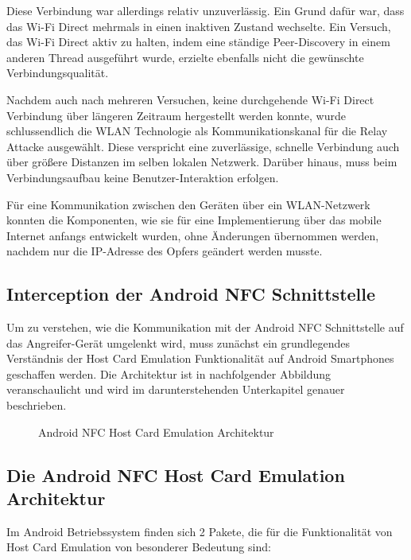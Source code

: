 Diese Verbindung war allerdings relativ unzuverlässig. Ein Grund dafür war, dass das Wi-Fi Direct mehrmals in einen inaktiven Zustand wechselte. Ein Versuch, das Wi-Fi Direct aktiv zu halten, indem eine ständige Peer-Discovery in einem anderen Thread ausgeführt wurde, erzielte ebenfalls nicht die gewünschte Verbindungsqualität. 

Nachdem auch nach mehreren Versuchen, keine durchgehende Wi-Fi Direct Verbindung über längeren Zeitraum hergestellt werden konnte, wurde schlussendlich die WLAN Technologie als Kommunikationskanal für die Relay Attacke ausgewählt. Diese verspricht eine zuverlässige, schnelle Verbindung auch über größere Distanzen im selben lokalen Netzwerk. Darüber hinaus, muss beim Verbindungsaufbau keine Benutzer-Interaktion erfolgen. 

Für eine Kommunikation zwischen den Geräten über ein WLAN-Netzwerk konnten die Komponenten, wie sie für eine Implementierung über das mobile Internet anfangs entwickelt wurden, ohne Änderungen übernommen werden, nachdem nur die IP-Adresse des Opfers geändert werden musste. 

\subsection{Interception der Android NFC Schnittstelle}

Um zu verstehen, wie die Kommunikation mit der Android NFC Schnittstelle auf das Angreifer-Gerät umgelenkt wird, muss zunächst ein grundlegendes Verständnis der Host Card Emulation Funktionalität auf Android Smartphones geschaffen werden. Die Architektur ist in nachfolgender Abbildung veranschaulicht und wird im darunterstehenden Unterkapitel genauer beschrieben. 

\begin{figure}
	\caption{Android NFC Host Card Emulation Architektur}
\end{figure}

\subsection{Die Android NFC Host Card Emulation Architektur}

Im Android Betriebssystem finden sich 2 Pakete, die für die Funktionalität von Host Card Emulation von besonderer Bedeutung sind: 

